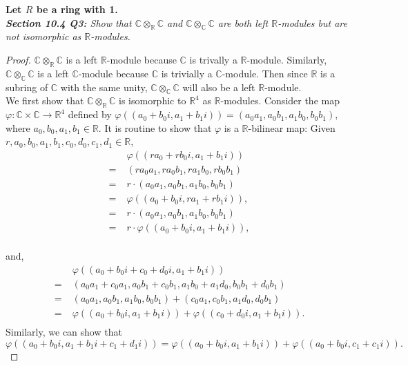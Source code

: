 \documentclass{article}
\begin{document}
\textbf{Let $R$ be a ring with 1.} \\

\it \textbf{Section 10.4 Q3:} Show that
  $\mathbb{C}\otimes_\mathbb{R}\mathbb{C}$ and
  $\mathbb{C}\otimes_\mathbb{C}\mathbb{C}$ are both left
  $\mathbb{R}$-modules but are not isomorphic as $\mathbb{R}$-modules.

  \begin{proof}
    $\mathbb{C}\otimes_\mathbb{R}\mathbb{C}$ is a left $\mathbb{R}$-module
    because $\mathbb{C}$ is trivally a $\mathbb{R}$-module. Similarly,
    $\mathbb{C}\otimes_\mathbb{C}\mathbb{C}$ is a left $\mathbb{C}$-module
    because $\mathbb{C}$ is trivially a $\mathbb{C}$-module. Then since
    $\mathbb{R}$ is a subring of $\mathbb{C}$ with the same unity,
    $\mathbb{C}\otimes_\mathbb{C}\mathbb{C}$ will also be a left
    $\mathbb{R}$-module. \\

    We first show that $\mathbb{C}\otimes_\mathbb{R}\mathbb{C}$ is
    isomorphic to $\mathbb{R}^4$ as $\mathbb{R}$-modules. Consider the map
    $\varphi:\mathbb{C}\times\mathbb{C}\rightarrow\mathbb{R}^4$ defined by
    $\varphi((a_0+b_0i,a_1+b_1i)) =(a_0a_1,a_0b_1,a_1b_0,b_0b_1)$, where
    $a_0,b_0,a_1,b_1\in\mathbb{R}$. It is routine to show that $\varphi$ is
    a $\mathbb{R}$-bilinear map: Given
    $r,a_0,b_0,a_1,b_1,c_0,d_0,c_1,d_1\in\mathbb{R}$,
    \begin{align*}
      \;&\varphi((ra_0+rb_0i,a_1+b_1i))\\
      =\;&(ra_0a_1,ra_0b_1,ra_1b_0,rb_0b_1)\\
      =\;&r\cdot(a_0a_1,a_0b_1,a_1b_0,b_0b_1)\\
      =\;&\varphi((a_0+b_0i,ra_1+rb_1i)),\\
      =\;&r\cdot(a_0a_1,a_0b_1,a_1b_0,b_0b_1)\\
      =\;&r\cdot\varphi((a_0+b_0i,a_1+b_1i)),\\
    \end{align*}

    and,
    \begin{align*}
      \;&\varphi((a_0+b_0i+c_0+d_0i, a_1+b_1i))\\
      =\;&(a_0a_1+c_0a_1, a_0b_1+c_0b_1, a_1b_0+a_1d_0, b_0b_1+d_0b_1)\\
      =\;&(a_0a_1,a_0b_1,a_1b_0,b_0b_1) +(c_0a_1,c_0b_1,a_1d_0,d_0b_1)\\
      =\;&\varphi((a_0+b_0i, a_1+b_1i)) +\varphi((c_0+d_0i, a_1+b_1i)).\\
    \end{align*}
    Similarly, we can show that
    \[\varphi((a_0+b_0i, a_1+b_1i+c_1+d_1i))
    =\varphi((a_0+b_0i, a_1+b_1i)) +\varphi((a_0+b_0i, c_1+c_1i)).\]


\end{proof}
\end{document}
